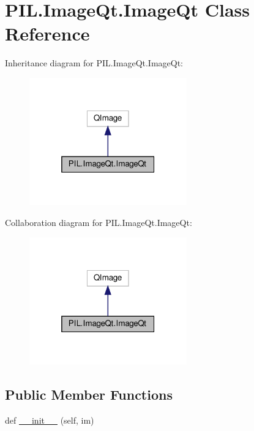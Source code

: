 \hypertarget{classPIL_1_1ImageQt_1_1ImageQt}{}\section{P\+I\+L.\+Image\+Qt.\+Image\+Qt Class Reference}
\label{classPIL_1_1ImageQt_1_1ImageQt}


Inheritance diagram for P\+I\+L.\+Image\+Qt.\+Image\+Qt\+:
\nopagebreak
\begin{figure}[H]
\begin{center}
\leavevmode
\includegraphics[width=193pt]{classPIL_1_1ImageQt_1_1ImageQt__inherit__graph}
\end{center}
\end{figure}


Collaboration diagram for P\+I\+L.\+Image\+Qt.\+Image\+Qt\+:
\nopagebreak
\begin{figure}[H]
\begin{center}
\leavevmode
\includegraphics[width=193pt]{classPIL_1_1ImageQt_1_1ImageQt__coll__graph}
\end{center}
\end{figure}
\subsection*{Public Member Functions}
\begin{DoxyCompactItemize}
\item 
def \hyperlink{classPIL_1_1ImageQt_1_1ImageQt_ae0121658d7b1c941d4cbe604170cd898}{\+\_\+\+\_\+init\+\_\+\+\_\+} (self, im)
\end{DoxyCompactItemize}


